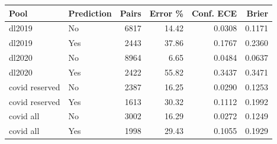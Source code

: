 \begin{tabular}{@{}llrrrr@{}}
\toprule
Pool & Prediction & Pairs & Error \% & Conf. ECE & Brier \\
\midrule
dl2019 & No & 6817 & 14.42 & 0.0308 & 0.1171 \\
dl2019 & Yes & 2443 & 37.86 & 0.1767 & 0.2360 \\
dl2020 & No & 8964 & 6.65 & 0.0484 & 0.0637 \\
dl2020 & Yes & 2422 & 55.82 & 0.3437 & 0.3471 \\
covid reserved & No & 2387 & 16.25 & 0.0290 & 0.1253 \\
covid reserved & Yes & 1613 & 30.32 & 0.1112 & 0.1992 \\
covid all & No & 3002 & 16.29 & 0.0272 & 0.1249 \\
covid all & Yes & 1998 & 29.43 & 0.1055 & 0.1929 \\
\bottomrule
\end{tabular}
